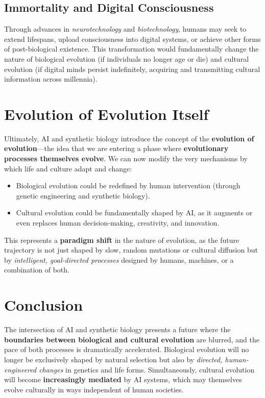 \documentclass[10pt,titlepage]{book}
\begin{document}
\subsection{Immortality and Digital Consciousness}

Through advances in \textit{neurotechnology} and \textit{biotechnology}, humans may seek to extend lifespans, upload consciousness into digital systems, or achieve other forms of post-biological existence. This transformation would fundamentally change the nature of biological evolution (if individuals no longer age or die) and cultural evolution (if digital minds persist indefinitely, acquiring and transmitting cultural information across millennia).

\section{Evolution of Evolution Itself}

Ultimately, AI and synthetic biology introduce the concept of the \textbf{evolution of evolution}—the idea that we are entering a phase where \textbf{evolutionary processes themselves evolve}. We can now modify the very mechanisms by which life and culture adapt and change:
\begin{itemize}
    \item Biological evolution could be redefined by human intervention (through genetic engineering and synthetic biology).
    \item Cultural evolution could be fundamentally shaped by AI, as it augments or even replaces human decision-making, creativity, and innovation.
\end{itemize}

This represents a \textbf{paradigm shift} in the nature of evolution, as the future trajectory is not just shaped by slow, random mutations or cultural diffusion but by \textit{intelligent, goal-directed processes} designed by humans, machines, or a combination of both.

\section{Conclusion}

The intersection of AI and synthetic biology presents a future where the \textbf{boundaries between biological and cultural evolution} are blurred, and the pace of both processes is dramatically accelerated. Biological evolution will no longer be exclusively shaped by natural selection but also by \textit{directed, human-engineered changes} in genetics and life forms. Simultaneously, cultural evolution will become \textbf{increasingly mediated} by AI systems, which may themselves evolve culturally in ways independent of human societies.
\end{document}

